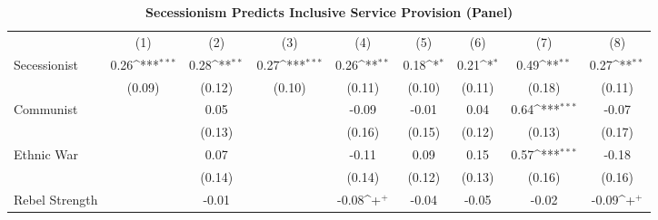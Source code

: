 \documentclass[12pt, letterpaper]{article}
\begin{document}
\newpage
\begin{landscape}
\begin{table}[htbp]\centering
\begin{small}
\def\sym#1{\ifmmode^{#1}\else\(^{#1}\)\fi}
\renewcommand\thetable{A.\Roman{table}}
\makeatletter
\def\myrow{}
\CT@everycr{\noalign{%
\global\let\CT@row@color\relax
\stepcounter{mym13}%
\ifnum\value{mym13}=2
  \gdef\myrow{\rowcolor{gray!50}}
\else\ifnum\value{mym13}=4
  \gdef\myrow{}
\fi\fi
}\myrow}
\caption{\textbf{Secessionism Predicts Inclusive Service Provision (Panel)}}
\label{table:conditionalp}
\begin{tabular}{l*{8}{c}}
\hline\hline
                    &\multicolumn{1}{c}{(1)}&\multicolumn{1}{c}{(2)}&\multicolumn{1}{c}{(3)}&\multicolumn{1}{c}{(4)}&\multicolumn{1}{c}{(5)}&\multicolumn{1}{c}{(6)}&\multicolumn{1}{c}{(7)}&\multicolumn{1}{c}{(8)}\\
Secessionist      &        0.26\sym{***}&        0.28\sym{**} &        0.27\sym{***}&        0.26\sym{**} &        0.18\sym{*}  &        0.21\sym{*}  &        0.49\sym{**} &        0.27\sym{**} \\
                    &      (0.09)         &      (0.12)         &      (0.10)         &      (0.11)         &      (0.10)         &      (0.11)         &      (0.18)         &      (0.11)         \\
Communist           &                     &        0.05         &                     &       -0.09         &       -0.01         &        0.04         &        0.64\sym{***}&       -0.07         \\
                    &                     &      (0.13)         &                     &      (0.16)         &      (0.15)         &      (0.12)         &      (0.13)         &      (0.17)         \\
Ethnic War          &                     &        0.07         &                     &       -0.11         &        0.09         &        0.15         &        0.57\sym{***}&       -0.18         \\
                    &                     &      (0.14)         &                     &      (0.14)         &      (0.12)         &      (0.13)         &      (0.16)         &      (0.16)         \\
Rebel Strength      &                     &       -0.01         &                     &       -0.08\sym{+}  &       -0.04         &       -0.05         &       -0.02         &       -0.09\sym{+}  \\

\end{tabular}
\end{small}
\end{table}
\end{landscape}
\end{document}
